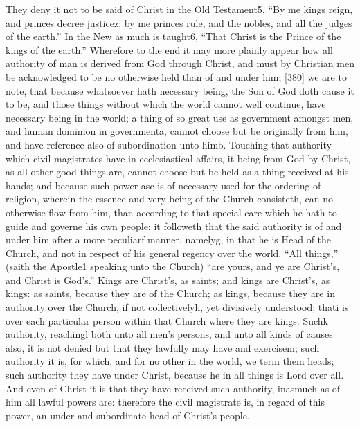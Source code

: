 They deny it not to be said of Christ in the Old Testament5, “By me kings reign, and princes decree justicez; by me princes rule, and the nobles, and all the judges of the earth.” In the New as much is taught6, “That Christ is the Prince of the kings of the earth.” Wherefore to the end it may more plainly appear how all authority of man is derived from God through Christ, and must by Christian men be acknowledged to be no otherwise held than of and under him; [380] we are to note, that because whatsoever hath necessary being, the Son of God doth cause it to be, and those things without which the world cannot well continue, have necessary being in the world; a thing of so great use as government amongst men, and human dominion in governmenta, cannot choose but be originally from him, and have reference also of subordination unto himb. Touching that authority which civil magistrates have in ecclesiastical affairs, it being from God by Christ, as all other good things are, cannot choose but be held as a thing received at his hands; and because such power asc is of necessary used for the ordering of religion, wherein the essence and very being of the Church consisteth, can no otherwise flow from him, than according to that special care which he hath to guide and governe his own people: it followeth that the said authority is of and under him after a more peculiarf manner, namelyg, in that he is Head of the Church, and not in respect of his general regency over the world. “All things,” (saith the Apostle1 speaking unto the Church) “are yours, and ye are Christ’s, and Christ is God’s.” Kings are Christ’s, as saints; and kings are Christ’s, as kings: as saints, because they are of the Church; as kings, because they are in authority over the Church, if not collectivelyh, yet divisively understood; thati is over each particular person within that Church where they are kings. Suchk authority, reachingl both unto all men’s persons, and unto all kinds of causes also, it is not denied but that they lawfully may have and exercisem; such authority it is, for which, and for no other in the world, we term them heads; such authority they have under Christ, because he in all things is Lord over all. And even of Christ it is that they have received such authority, inasmuch as of him all lawful powers are: therefore the civil magistrate is, in regard of this power, an under and subordinate head of Christ’s people.

